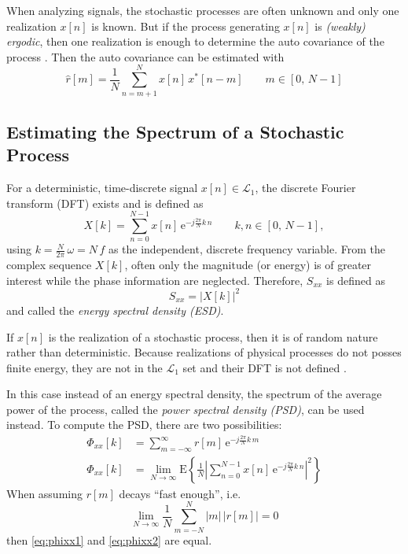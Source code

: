 When analyzing signals, the stochastic processes are often unknown and only one realization $x[n]$ is known. But if the process generating $x[n]$ is \textit{(weakly) ergodic}, then one realization is enough to determine the auto covariance of the process \cite[p.~252]{Puente2019}.
Then the auto covariance can be estimated with
\begin{equation}\label{eq:autocovarianveEstimation}
\hat{r}[m] = \frac{1}{N} \sum_{n=m+1}^{N} x[n]\,x^\ast[n-m]\qquad m \in [0,\,N-1]
\end{equation} 


\subsection{Estimating the Spectrum of a Stochastic Process}
For a deterministic, time-discrete signal $x[n] \in \mathcal{L}_1$, the discrete Fourier transform (DFT) exists\cite{Lapidoth2019} and is defined as
\begin{equation}
X[k] = \sum_{n=0}^{N-1} x[n]\,\text{e}^{-j\frac{2\pi}{N}k\,n}\qquad k,n \in [0,\,N-1],
\end{equation}
using $k=\frac{N}{2\pi}\,\omega = N\,f$ as the independent, discrete frequency variable. 
From the complex sequence $X[k]$, often only the magnitude (or energy) is of greater interest while the phase information are neglected. 
Therefore, $S_{xx}$ is defined as
\begin{equation}
S_{xx} = \left|X[k]\right|^2
\end{equation}
and called the \textit{energy spectral density (ESD)}.

If $x[n]$ is the realization of a stochastic process, then it is of random nature rather than deterministic.
Because realizations of physical processes do not posses finite energy, they are not in the $\mathcal{L}_1$ set and their DFT is not defined \cite[p.~5]{Stoica1997}.

In this case instead of an energy spectral density, the spectrum of the average power of the process, called the \textit{power spectral density (PSD)}, can be used instead.
To compute the PSD, there are two possibilities:
\begin{align}
\Phi_{xx}[k] &= \sum_{m=-\infty}^{\infty} r[m]\,\text{e}^{-j\frac{2\pi}{N}k\,m} \label{eq:phixx1}\\
\Phi_{xx}[k] &= \lim_{N\rightarrow\infty} \text{E}\left\{\frac{1}{N}\left|\sum_{n=0}^{N-1} x[n]\,\text{e}^{-j\frac{2\pi}{N}k\,n}\right|^2 \right\} \label{eq:phixx2}
\end{align}
When assuming $r[m]$ decays ``fast enough'', i.e.
\begin{equation}
\lim_{N\rightarrow\infty} \frac{1}{N} \sum_{m=-N}^{N} |m|\,\left|r[m]\right| = 0
\end{equation}
then \autoref{eq:phixx1} and \autoref{eq:phixx2} are equal\cite[p.~7]{Stoica1997}.

